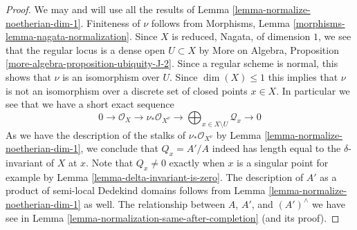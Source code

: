 \documentclass[10pt,a4paper]{amsart}
\theoremstyle{plain}
\theoremstyle{definition}
\theoremstyle{remark}
\numberwithin{equation}{subsection}
\begin{document}
\begin{proof}
We may and will use all the results of
Lemma \ref{lemma-normalize-noetherian-dim-1}.
Finiteness of $\nu$ follows from
Morphisms, Lemma \ref{morphisms-lemma-nagata-normalization}.
Since $X$ is reduced, Nagata, of dimension $1$, we see that the
regular locus is a dense open $U \subset X$ by
More on Algebra, Proposition \ref{more-algebra-proposition-ubiquity-J-2}.
Since a regular scheme is normal, this shows that $\nu$
is an isomorphism over $U$.
Since $\dim(X) \leq 1$ this implies that $\nu$ is not an isomorphism
over a discrete set of closed points $x \in X$.
In particular we see that we have a short exact sequence
$$
0 \to \mathcal{O}_X \to \nu_*\mathcal{O}_{X^\nu} \to
\bigoplus\nolimits_{x \in X \setminus U} \mathcal{Q}_x \to 0
$$
As we have the description of the stalks of $\nu_*\mathcal{O}_{X^\nu}$
by Lemma \ref{lemma-normalize-noetherian-dim-1}, we conclude that
$Q_x = A'/A$ indeed has length equal to the $\delta$-invariant of $X$ at $x$.
Note that $Q_x \not = 0$ exactly when $x$ is a singular point for
example by Lemma \ref{lemma-delta-invariant-is-zero}.
The description of $A'$ as a product of semi-local Dedekind domains follows
from Lemma \ref{lemma-normalize-noetherian-dim-1} as well.
The relationship between $A$, $A'$, and $(A')^\wedge$
we have see in Lemma \ref{lemma-normalization-same-after-completion}
(and its proof).
\end{proof}
\end{document}
